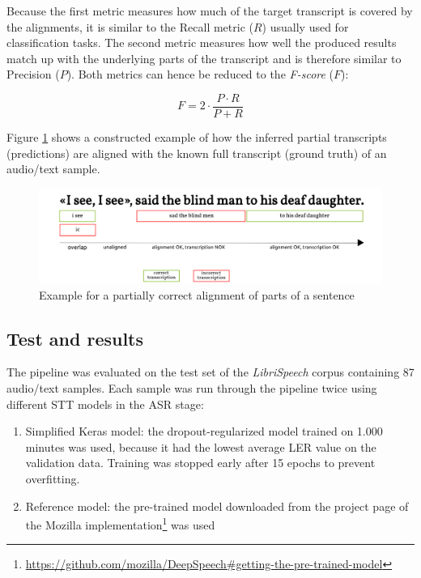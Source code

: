 Because the first metric measures how much of the target transcript is covered by the alignments, it is similar to the Recall metric ($R$) usually used for classification tasks. The second metric measures how well the produced results match up with the underlying parts of the transcript and is therefore similar to Precision ($P$). Both metrics can hence be reduced to the \textit{F-score} ($F$):

\[ 
F = 2\cdot \frac{P\cdot R}{P+R}
 \]

Figure \ref{example_alignment} shows a constructed example of how the inferred partial transcripts (predictions) are aligned with the known full transcript (ground truth) of an audio/text sample.

\begin{figure}
	\includegraphics[width=\linewidth]{./img/example_alignment.png}
	\caption{Example for a partially correct alignment of parts of a sentence}
	\label{example_alignment}
\end{figure}

\subsection{Test and results}

The pipeline was evaluated on the test set of the \textit{LibriSpeech} corpus containing 87 audio/text samples. Each sample was run through the pipeline twice using different \ac{STT} models in the \ac{ASR} stage:

\begin{enumerate}
	\item Simplified Keras model: the dropout-regularized model trained on 1.000 minutes was used, because it had the lowest average \ac{LER} value on the validation data. Training was stopped early after 15 epochs to prevent overfitting. 
	\item Reference model: the pre-trained model downloaded from the project page of the Mozilla implementation\footnote{\url{https://github.com/mozilla/DeepSpeech\#getting-the-pre-trained-model}} was used
\end{enumerate}

